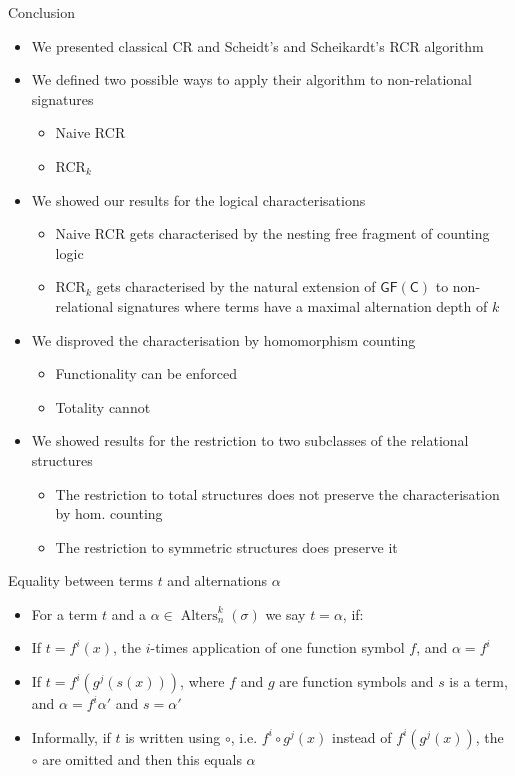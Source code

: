 \documentclass[aspectratio=169]{beamer}
\newcommand{\GFC}{\mathsf{GF}(\mathsf{C})}
\begin{document}
	\begin{frame}{Conclusion}
		\begin{itemize}
			\item We presented classical CR and Scheidt's and Scheikardt's RCR algorithm
			\item We defined two possible ways to apply their algorithm to non-relational signatures
			\begin{itemize}
				\item Naive RCR
				\item RCR$_k$
			\end{itemize}
			\item We showed our results for the logical characterisations
			\begin{itemize}
				\item Naive RCR gets characterised by the nesting free fragment of counting logic
				\item RCR$_k$ gets characterised by the natural extension of $\GFC$ to non-relational signatures where terms have a maximal alternation depth of $k$
			\end{itemize}
			\item We disproved the characterisation by homomorphism counting
			\begin{itemize}
				\item Functionality can be enforced
				\item Totality cannot
			\end{itemize}
			\item We showed results for the restriction to two subclasses of the relational structures
			\begin{itemize}
				\item The restriction to total structures does not preserve the characterisation by hom. counting
				\item The restriction to symmetric structures does preserve it
			\end{itemize}
		\end{itemize}
	\end{frame}
	
	\appendix
	
	\begin{frame}{Equality between terms $t$ and alternations $\alpha$}
		\begin{itemize}
			\item For a term $t$ and a $\alpha\in\operatorname{Alters}^k_n(\sigma)$ we say $t=\alpha$, if:
			\item If $t=f^i(x)$, the $i$-times application of one function symbol $f$, and $\alpha=f^i$
			\item If $t=f^i(g^j(s(x)))$, where $f$ and $g$ are function symbols and $s$ is a term, and $\alpha=f^i\alpha'$ and $s=\alpha'$
			\item Informally, if $t$ is written using $\circ$, i.e. $f^i\circ g^j(x)$ instead of $f^i(g^j(x))$, the $\circ$ are omitted and then this equals $\alpha$
		\end{itemize}
	\end{frame}
	
\end{document}
